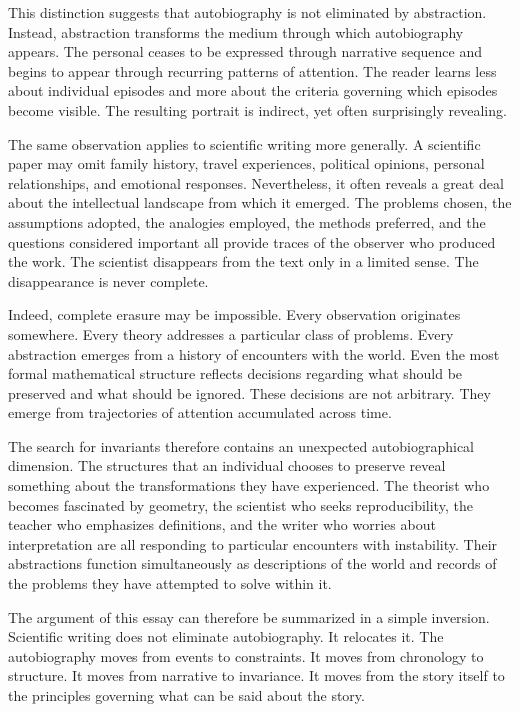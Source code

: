 \documentclass[11pt]{article}
\theoremstyle{plain}
\begin{document}
This distinction suggests that autobiography is not eliminated by abstraction. Instead, abstraction transforms the medium through which autobiography appears. The personal ceases to be expressed through narrative sequence and begins to appear through recurring patterns of attention. The reader learns less about individual episodes and more about the criteria governing which episodes become visible. The resulting portrait is indirect, yet often surprisingly revealing.

The same observation applies to scientific writing more generally. A scientific paper may omit family history, travel experiences, political opinions, personal relationships, and emotional responses. Nevertheless, it often reveals a great deal about the intellectual landscape from which it emerged. The problems chosen, the assumptions adopted, the analogies employed, the methods preferred, and the questions considered important all provide traces of the observer who produced the work. The scientist disappears from the text only in a limited sense. The disappearance is never complete.

Indeed, complete erasure may be impossible. Every observation originates somewhere. Every theory addresses a particular class of problems. Every abstraction emerges from a history of encounters with the world. Even the most formal mathematical structure reflects decisions regarding what should be preserved and what should be ignored. These decisions are not arbitrary. They emerge from trajectories of attention accumulated across time.

The search for invariants therefore contains an unexpected autobiographical dimension. The structures that an individual chooses to preserve reveal something about the transformations they have experienced. The theorist who becomes fascinated by geometry, the scientist who seeks reproducibility, the teacher who emphasizes definitions, and the writer who worries about interpretation are all responding to particular encounters with instability. Their abstractions function simultaneously as descriptions of the world and records of the problems they have attempted to solve within it.

The argument of this essay can therefore be summarized in a simple inversion. Scientific writing does not eliminate autobiography. It relocates it. The autobiography moves from events to constraints. It moves from chronology to structure. It moves from narrative to invariance. It moves from the story itself to the principles governing what can be said about the story.
\end{document}
